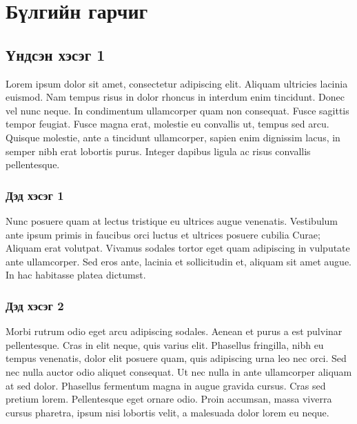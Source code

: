
\chapter{Бүлгийн гарчиг} %

\label{ChapterX} %


\section{Үндсэн хэсэг 1}

Lorem ipsum dolor sit amet, consectetur adipiscing elit. Aliquam ultricies lacinia euismod. Nam tempus risus in dolor rhoncus in interdum enim tincidunt. Donec vel nunc neque. In condimentum ullamcorper quam non consequat. Fusce sagittis tempor feugiat. Fusce magna erat, molestie eu convallis ut, tempus sed arcu. Quisque molestie, ante a tincidunt ullamcorper, sapien enim dignissim lacus, in semper nibh erat lobortis purus. Integer dapibus ligula ac risus convallis pellentesque.

\subsection{Дэд хэсэг 1}

Nunc posuere quam at lectus tristique eu ultrices augue venenatis. Vestibulum ante ipsum primis in faucibus orci luctus et ultrices posuere cubilia Curae; Aliquam erat volutpat. Vivamus sodales tortor eget quam adipiscing in vulputate ante ullamcorper. Sed eros ante, lacinia et sollicitudin et, aliquam sit amet augue. In hac habitasse platea dictumst.


\subsection{Дэд хэсэг 2}
Morbi rutrum odio eget arcu adipiscing sodales. Aenean et purus a est pulvinar pellentesque. Cras in elit neque, quis varius elit. Phasellus fringilla, nibh eu tempus venenatis, dolor elit posuere quam, quis adipiscing urna leo nec orci. Sed nec nulla auctor odio aliquet consequat. Ut nec nulla in ante ullamcorper aliquam at sed dolor. Phasellus fermentum magna in augue gravida cursus. Cras sed pretium lorem. Pellentesque eget ornare odio. Proin accumsan, massa viverra cursus pharetra, ipsum nisi lobortis velit, a malesuada dolor lorem eu neque.

